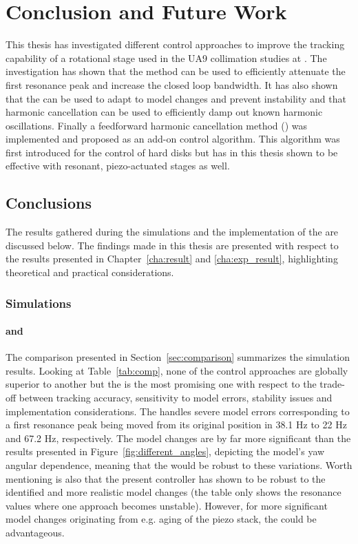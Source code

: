 \chapter{Conclusion and Future Work}\label{cha:conclusion}
This thesis has investigated different control approaches to improve the tracking capability of a rotational stage used in the UA9 collimation studies at \abbrCERN. The investigation has shown that the \abbrIRC method can be used to efficiently attenuate the first resonance peak and increase the closed loop bandwidth. It has also shown that the \abbrMRACPE can be used to adapt to model changes and prevent instability and that harmonic cancellation can be used to efficiently damp out known harmonic oscillations. Finally a feedforward harmonic cancellation method (\abbrRFDC) was implemented and proposed as an add-on control algorithm. This algorithm was first introduced for the control of hard disks but has in this thesis shown to be effective with resonant, piezo-actuated stages as well.

\section{Conclusions}
The results gathered during the simulations and the implementation of the \abbrRFDC are discussed below. The findings made in this thesis are presented with respect to the results presented in Chapter~\ref{cha:result} and \ref{cha:exp_result}, highlighting theoretical and practical considerations.

\subsection{Simulations}
\subsubsection{\abbrIRC and \abbrMRACPE}
The comparison presented in Section~\ref{sec:comparison} summarizes the simulation results. Looking at Table~\ref{tab:comp}, none of the control approaches are globally superior to another but the \abbrIRC is the most promising one with respect to the trade-off between tracking accuracy, sensitivity to model errors, stability issues and implementation considerations. The \abbrIRC handles severe model errors corresponding to a first resonance peak being moved from its original position in 38.1 Hz to 22 Hz and 67.2 Hz, respectively. The model changes are by far more significant than the results presented in Figure~\ref{fig:different_angles}, depicting the model's yaw angular dependence, meaning that the \abbrIRC would be robust to these variations. Worth mentioning is also that the present controller has shown to be robust to the identified and more realistic model changes (the table only shows the resonance values where one approach becomes unstable). However, for more significant model changes originating from e.g. aging of the piezo stack, the \abbrIRC could be advantageous.

